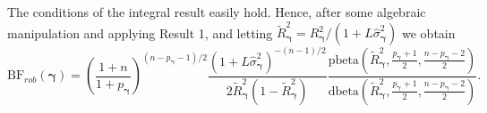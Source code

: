 \documentclass[12pt]{article}
\def\vectorfontone{\bf}
\def\vectorfonttwo{\boldsymbol}
\def\vy{{\vectorfontone y}}                      %
\def\vgamma{{\vectorfonttwo \gamma}}             %
\def\ds{\displaystyle}
\begin{document}
\noindent The conditions of the integral result easily hold.
%
%
%
%
%
%
Hence, after some algebraic manipulation and applying Result 1, and letting
$\widetilde{R}_\vgamma^2 = R_\vgamma^2/(1 + L\widehat{\sigma}_\vgamma^2)$ we obtain
\begin{equation}\label{eq:yGivenGammaRobust2}
\ds \mbox{BF}_{{rob}}(\vgamma)
= \left( \frac{1 + n}{1 + p_\vgamma} \right)^{(n - p_\vgamma - 1)/2} \frac{\left( 1 + L\widehat{\sigma}_\vgamma^2 \right)^{-(n - 1)/2}}{2 \widetilde{R}_\vgamma^2(1 - \widetilde{R}_\vgamma^2)} 
\frac{
	\mbox{pbeta}\left( 
	\widetilde{R}_\vgamma^2,
	\frac{p_\vgamma +1}{2},
	\frac{n - p_\vgamma - 2}{2} 
	\right)
}{
	\mbox{dbeta}\left( 
	\widetilde{R}_\vgamma^2,
	\frac{p_\vgamma +1}{2},
	\frac{n - p_\vgamma - 2}{2} 
	\right)
}.
\end{equation}
\end{document}
